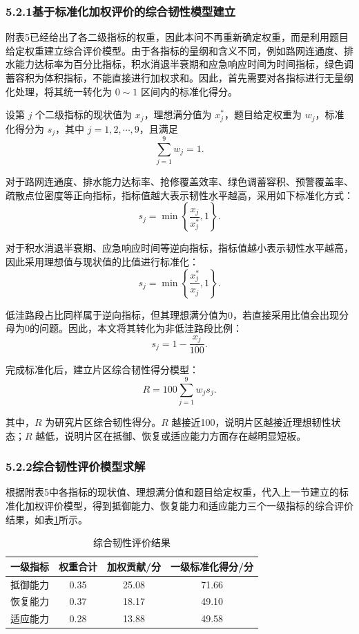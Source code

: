 \documentclass[UTF8,a4paper,12pt]{ctexart}
\begin{document}
\subsubsection{5.2.1基于标准化加权评价的综合韧性模型建立}

附表5已经给出了各二级指标的权重，因此本问不再重新确定权重，而是利用题目给定权重建立综合评价模型。由于各指标的量纲和含义不同，例如路网连通度、排水能力达标率为百分比指标，积水消退半衰期和应急响应时间为时间指标，绿色调蓄容积为体积指标，不能直接进行加权求和。因此，首先需要对各指标进行无量纲化处理，将其统一转化为 \(0\sim1\) 区间内的标准化得分。

设第 \(j\) 个二级指标的现状值为 \(x_j\)，理想满分值为 \(x_j^*\)，题目给定权重为 \(w_j\)，标准化得分为 \(s_j\)，其中 \(j=1,2,\cdots,9\)，且满足
\[
\sum_{j=1}^{9}w_j=1.
\]

对于路网连通度、排水能力达标率、抢修覆盖效率、绿色调蓄容积、预警覆盖率、疏散点位密度等正向指标，指标值越大表示韧性水平越高，采用如下标准化方式：
\[
s_j=\min\left\{\frac{x_j}{x_j^*},1\right\}.
\]

对于积水消退半衰期、应急响应时间等逆向指标，指标值越小表示韧性水平越高，因此采用理想值与现状值的比值进行标准化：
\[
s_j=\min\left\{\frac{x_j^*}{x_j},1\right\}.
\]

低洼路段占比同样属于逆向指标，但其理想满分值为0，若直接采用比值会出现分母为0的问题。因此，本文将其转化为非低洼路段比例：
\[
s_j=1-\frac{x_j}{100}.
\]

完成标准化后，建立片区综合韧性得分模型：
\[
R=100\sum_{j=1}^{9}w_js_j .
\]

其中，\(R\) 为研究片区综合韧性得分。\(R\) 越接近100，说明片区越接近理想韧性状态；\(R\) 越低，说明片区在抵御、恢复或适应能力方面存在越明显短板。

\subsubsection{5.2.2综合韧性评价模型求解}

根据附表5中各指标的现状值、理想满分值和题目给定权重，代入上一节建立的标准化加权评价模型，得到抵御能力、恢复能力和适应能力三个一级指标的综合评价结果，如表\ref{tab:q2-level-score}所示。

\begin{table}[H]
\centering
\caption{综合韧性评价结果}
\label{tab:q2-level-score}
\begin{tabular}{lccc}
\toprule
一级指标 & 权重合计 & 加权贡献/分 & 一级标准化得分/分 \\
\midrule
抵御能力 & 0.35 & 25.08 & 71.66 \\
恢复能力 & 0.37 & 18.17 & 49.10 \\
适应能力 & 0.28 & 13.88 & 49.58 \\
\bottomrule
\end{tabular}
\end{table}
\end{document}
